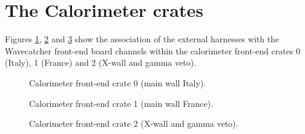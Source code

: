 
\clearpage
\section{The Calorimeter crates}

Figures  \ref{fig:calosignal:crates:0},  \ref{fig:calosignal:crates:1}
and \ref{fig:calosignal:crates:2} show the association of the external
harnesses  with the  Wavecatcher front-end  board channels  within the
calorimeter front-end crates  0 (Italy), 1 (France) and  2 (X-wall and
gamma veto).

\begin{figure}[h!]
  \begin{center}
    \scalebox{0.6}{}
  \end{center}
  \caption{Calorimeter front-end crate 0 (main wall Italy).}
  \label{fig:calosignal:crates:0}
\end{figure}

\begin{figure}[h!]
  \begin{center}
    \scalebox{0.6}{}
  \end{center}
  \caption{Calorimeter front-end crate 1 (main wall France).}
  \label{fig:calosignal:crates:1}
 
\end{figure}

\begin{figure}[h!]
  \begin{center}
    \scalebox{0.6}{}
  \end{center}
  \caption{Calorimeter front-end crate 2 (X-wall and gamma veto).}
  \label{fig:calosignal:crates:2}
 
\end{figure}

